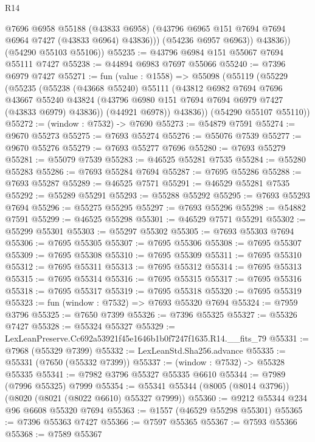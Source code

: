 \begin{lexlean}{R14}
\begin{coremodule}
                @7696
                @6958
                @55188
                (@43833 @6958)
                (@43796 @6965 @151 @7694 @7694 @6964 @7427 (@43833 @6964) @43836)))
            (@54236 @6957 @6963))
          @43836))
      (@54290 @55103 @55106))
@55235 := @43796 @6984 @151 @55067 @7694 @55111 @7427
@55238 := @44894 @6983 @7697 @55066
@55240 := @7396 @6979 @7427
@55271 := fun (value : @1558) =>
  @55098
    (@55119
      (@55229
        (@55235
          (@55238
            (@43668 @55240)
            @55111
            (@43812
              @6982
              @7694
              @7696
              @43667
              @55240
              @43824
              (@43796 @6980 @151 @7694 @7694 @6979 @7427 (@43833 @6979) @43836))
            (@44921 @6978))
          @43836))
      (@54290 @55107 @55110))
@55272 := (window : @7532) -> @7690
@55273 := @54879 @7591
@55274 := @9670 @55273
@55275 := @7693 @55274
@55276 := @55076 @7539
@55277 := @9670 @55276
@55279 := @7693 @55277 @7696
@55280 := @7693 @55279
@55281 := @55079 @7539
@55283 := @46525 @55281 @7535
@55284 := @55280 @55283
@55286 := @7693 @55284 @7694
@55287 := @7695 @55286
@55288 := @7693 @55287
@55289 := @46525 @7571
@55291 := @46529 @55281 @7535
@55292 := @55289 @55291
@55293 := @55288 @55292
@55295 := @7693 @55293 @7694
@55296 := @55275 @55295
@55297 := @7693 @55296
@55298 := @54882 @7591
@55299 := @46525 @55298
@55301 := @46529 @7571 @55291
@55302 := @55299 @55301
@55303 := @55297 @55302
@55305 := @7693 @55303 @7694
@55306 := @7695 @55305
@55307 := @7695 @55306
@55308 := @7695 @55307
@55309 := @7695 @55308
@55310 := @7695 @55309
@55311 := @7695 @55310
@55312 := @7695 @55311
@55313 := @7695 @55312
@55314 := @7695 @55313
@55315 := @7695 @55314
@55316 := @7695 @55315
@55317 := @7695 @55316
@55318 := @7695 @55317
@55319 := @7695 @55318
@55320 := @7695 @55319
@55323 := fun (window : @7532) => @7693 @55320 @7694
@55324 := @7959 @3796
@55325 := @7650 @7399
@55326 := @7396 @55325
@55327 := @55326 @7427
@55328 := @55324 @55327
@55329 := LexLeanPreserve.Cc692a53921f45e1646b1b0f7247f1635.R14.__fits_79
@55331 := @7968 (@55329 @7399)
@55332 := LexLeanStd.Sha256.advance
@55335 := @55331 (@7650 (@55332 @7399))
@55337 := (window : @7532) -> @55328 @55335
@55341 := @7982 @3796 @55327 @55335 @6610
@55344 := @7989 (@7996 @55325) @7999
@55354 := @55341 @55344 (@8005 (@8014 @3796)) (@8020 (@8021 (@8022 @6610) @55327 @7999))
@55360 := @9212 @55344 @234 @96 @6608 @55320 @7694
@55363 := @1557 (@46529 @55298 @55301)
@55365 := @7396 @55363 @7427
@55366 := @7597 @55365
@55367 := @7593 @55366
@55368 := @7589 @55367

\end{coremodule}
\end{lexlean}
